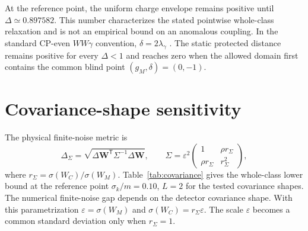 \documentclass[12pt]{iopjournal}
\begin{document}
At the reference point, the uniform charge envelope remains positive until $\Delta\simeq0.897582$. This number characterizes the stated pointwise whole-class relaxation and is not an empirical bound on an anomalous coupling. In the standard CP-even $WW\gamma$ convention, $\delta=2\lambda_\gamma$ \cite{HagiwaraPecceiZeppenfeldHikasa1987}. The static protected distance remains positive for every $\Delta<1$ and reaches zero when the allowed domain first contains the common blind point $(g_M,\delta)=(0,-1)$.

\section{Covariance-shape sensitivity}

The physical finite-noise metric is
\begin{equation}
\Delta_\Sigma=\sqrt{\Delta\bm W^{\mathsf T}\Sigma^{-1}\Delta\bm W},
\qquad
\Sigma=\varepsilon^2
\begin{pmatrix}
1 & \rho r_\Sigma\\
\rho r_\Sigma & r_\Sigma^2
\end{pmatrix},
\end{equation}
where $r_\Sigma=\sigma(W_C)/\sigma(W_M)$. Table~\ref{tab:covariance} gives the whole-class lower bound at the reference point $\sigma_k/m=0.10$, $L=2$ for the tested covariance shapes. The numerical finite-noise gap depends on the detector covariance shape. With this parametrization $\varepsilon=\sigma(W_M)$ and $\sigma(W_C)=r_\Sigma\varepsilon$. The scale $\varepsilon$ becomes a common standard deviation only when $r_\Sigma=1$.
\end{document}
